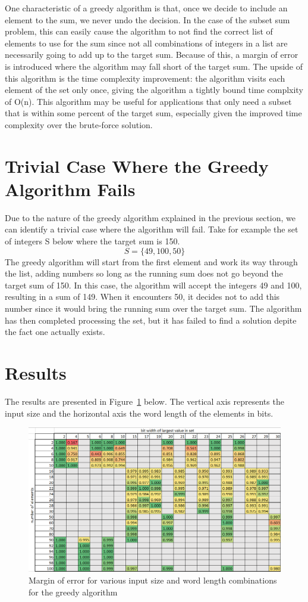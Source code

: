 \documentclass{article}
\begin{document}
One characteristic of a greedy algorithm is that, once we decide to include an element
to the sum, we never undo the decision. In the case of the subset sum problem, this
can easily cause the algorithm to not find the correct list of elements to use for the sum
since not all combinations of integers in a list are necessarily going to add up to
the target sum. Because of this, a margin of error is introduced where the algorithm
may fall short of the target sum. The upside of this algorithm is the time complexity
improvement: the algorithm visits each element of the set only once, giving the
algorithm a tightly bound time complxity of O(n). This algorithm may be useful for
applications that only need a subset that is within some percent of the target sum,
especially given the improved time complexity over the brute-force solution.

\section{Trivial Case Where the Greedy Algorithm Fails}
Due to the nature of the greedy algorithm explained in the previous section,
we can identify a trivial case where the algorithm will fail. Take for example
the set of integers S below where the target sum is 150.
$$S = \{49, 100, 50\}$$
The greedy algorithm will start from the first element and work its way through
the list, adding numbers so long as the running sum does not go beyond the target sum of 150.
In this case, the algorithm will accept the integers 49 and 100, resulting in a sum of 149.
When it encounters 50, it decides not to add this number since it would bring the running
sum over the target sum. The algorithm has then completed processing the set, but it
has failed to find a solution depite the fact one actually exists.

\section{Results}

The results are presented in Figure~\ref{fig:greedy} below. The vertical axis represents the
input size and the horizontal axis the word length of the elements in bits.

\begin{figure}[h]
\centering
\includegraphics[width=12cm]{P3_margin.png}
\caption{Margin of error for various input size and word length combinations for the greedy algorithm}
\label{fig:greedy}
\end{figure}
\end{document}

